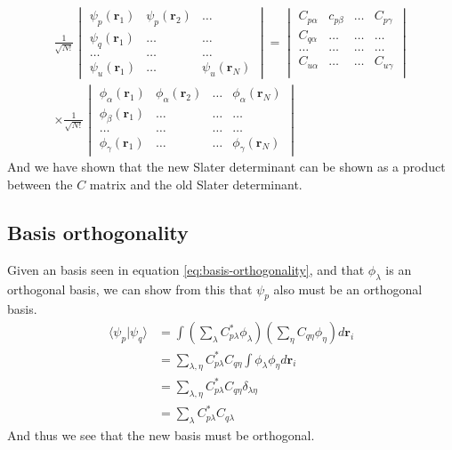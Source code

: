 \documentclass[11pt]{article}
\begin{document}
\begin{align*}
	\frac{1}{\sqrt{N!}}
	\begin{vmatrix}
		\psi_p(\mathbf{r}_1) & \psi_p(\mathbf{r}_2) & \dots \\
		\psi_q(\mathbf{r}_1) & \dots 				& \dots	\\
		\dots 				 & \dots 				& \dots \\
		\psi_u(\mathbf{r}_1) & \dots 				& \psi_u(\mathbf{r}_N)
	\end{vmatrix} = 
	\begin{vmatrix}
		C_{p\alpha} & c_{p\beta} 	& \dots 	& C_{p\gamma} \\
		C_{q\alpha} & \dots 		& \dots 	& \dots \\
		\dots 		& \dots			& \dots		& \dots \\
		C_{u\alpha} & \dots 		& \dots 	& C_{u\gamma} \\
	\end{vmatrix} \\
	\times 
	\frac{1}{\sqrt{N!}}
	\begin{vmatrix}
		\phi_\alpha(\mathbf{r}_1) & \phi_\alpha(\mathbf{r}_2) & \dots & \phi_\alpha(\mathbf{r}_N) \\
		\phi_\beta(\mathbf{r}_1) & \dots & \dots & \dots \\
		\dots & \dots & \dots & \dots \\
		\phi_\gamma(\mathbf{r}_1) & \dots & \dots & \phi_\gamma(\mathbf{r}_N)
	\end{vmatrix}
\end{align*}
And we have shown that the new Slater determinant can be shown as a product between the $C$ matrix and the old Slater determinant.

\subsection{Basis orthogonality}
Given an basis seen in equation \eqref{eq:basis-orthogonality}, and that $\phi_\lambda$ is an orthogonal basis, we can show from this that $\psi_p$ also must be an orthogonal basis.
\begin{align*}
	\langle \psi_p | \psi_q \rangle &= \int \left( \sum_\lambda C^*_{p\lambda}\phi_\lambda \right) \left( \sum_\eta C_{q\eta}\phi_\eta \right) d\mathbf{r}_i \\
	&= \sum_{\lambda,\eta} C^*_{p\lambda} C_{q\eta} \int \phi_\lambda \phi_\eta d\mathbf{r}_i \\
	&= \sum_{\lambda,\eta} C^*_{p\lambda} C_{q\eta} \delta_{\lambda\eta} \\
	&= \sum_{\lambda} C^*_{p\lambda} C_{q\lambda}
\end{align*}
And thus we see that the new basis must be orthogonal.

{}

\end{document}

